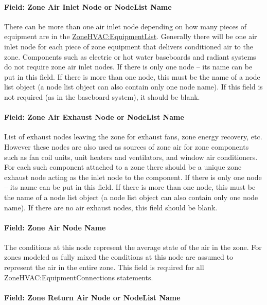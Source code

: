 \paragraph{Field: Zone Air Inlet Node or NodeList Name}\label{field-zone-air-inlet-node-or-nodelist-name}

There can be more than one air inlet node depending on how many pieces of equipment are in the \hyperref[zonehvacequipmentlist]{ZoneHVAC:EquipmentList}. Generally there will be one air inlet node for each piece of zone equipment that delivers conditioned air to the zone. Components such as electric or hot water baseboards and radiant systems do not require zone air inlet nodes. If there is only one node -- its name can be put in this field. If there is more than one node, this must be the name of a node list object (a node list object can also contain only one node name). If this field is not required (as in the baseboard system), it should be blank.

\paragraph{Field: Zone Air Exhaust Node or NodeList Name}\label{field-zone-air-exhaust-node-or-nodelist-name}

List of exhaust nodes leaving the zone for exhaust fans, zone energy recovery, etc. However these nodes are also used as sources of zone air for zone components such as fan coil units, unit heaters and ventilators, and window air conditioners. For each such component attached to a zone there should be a unique zone exhaust node acting as the inlet node to the component. If there is only one node -- its name can be put in this field. If there is more than one node, this must be the name of a node list object (a node list object can also contain only one node name). If there are no air exhaust nodes, this field should be blank.

\paragraph{Field: Zone Air Node Name}\label{field-zone-air-node-name}

The conditions at this node represent the average state of the air in the zone. For zones modeled as fully mixed the conditions at this node are assumed to represent the air in the entire zone. This field is required for all ZoneHVAC:EquipmentConnections statements.

\paragraph{Field: Zone Return Air Node or NodeList Name}\label{field-zone-return-air-node-or-nodelist-name}

